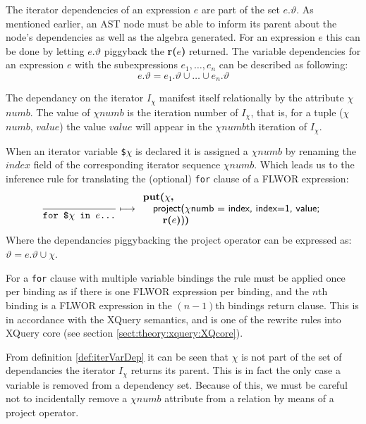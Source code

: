 The iterator dependencies of an expression $e$ are part of the set $e.\vartheta$. As mentioned earlier,
an AST node must be able to inform its parent about the node's dependencies as well as the algebra generated. For
an expression $e$ this can be done by letting $e.\vartheta$ piggyback the \textbf{r(}$e$\textbf{)} returned. The
variable dependencies for an expression $e$ with the subexpressions $e_{1},\ldots,e_{n}$ can be described as
following:
\begin{equation}
e.\vartheta = e_{1}.\vartheta\cup\ldots\cup e_{n}.\vartheta
\label{eq:trans:TD:depInheritance}
\end{equation}

The dependancy on the iterator $I_{\chi}$ manifest itself relationally by the attribute $\chi$$numb$. The value of
$\chi$$numb$ is the iteration number of $I_{\chi}$, that is, for a tuple ($\chi$$numb$, $value$) the value $value$
will appear in the $\chi$$numb$th iteration of $I_{\chi}$.

When an iterator variable \texttt{\$}$\chi$ is declared it is assigned a $\chi$$numb$ by renaming the $index$
field of the corresponding iterator sequence $\chi$$numb$. Which leads us to the inference rule for translating the
(optional) \texttt{for} clause of a FLWOR expression:
\begin{equation}
\frac{}{\mbox{\texttt{for \$}}\chi \mbox{\texttt{ in }} e \mbox{\texttt{\ldots}}}\longmapsto
\begin{array}{l}
\mbox{\textbf{put(}}\chi\mbox{\textbf{, }} \\ \quad
\mbox{\textsf{project(}}\chi\mbox{\textsf{numb = index, index=1, value;}} \\ \quad \quad
\mbox{\textbf{r(}}e\mbox{\textbf{)}\textsf{)}\textbf{)}}
\end{array}
\label{rule:trans:TD:forclause}
\end{equation}
Where the dependancies piggybacking the \textsf{project} operator can be expressed as:
$\vartheta = e.\vartheta \cup \chi$.

For a \texttt{for} clause with multiple variable bindings the rule must be applied once per binding as if there
is one FLWOR expression per binding, and the $n$th binding is a FLWOR expression in the $(n-1)$th bindings
return clause. This is in accordance with the XQuery semantics, and is one of the rewrite rules into XQuery core
(see section \ref{sect:theory:xquery:XQcore}).

From definition \ref{def:iterVarDep} it can be seen that $\chi$ is not part of the set of dependancies the iterator
$I_{\chi}$ returns its parent. This is in fact the only case a variable is removed from a dependency set. Because
of this, we must be careful not to incidentally remove a $\chi$$numb$ attribute from a relation by means of a
\textsf{project} operator. 

